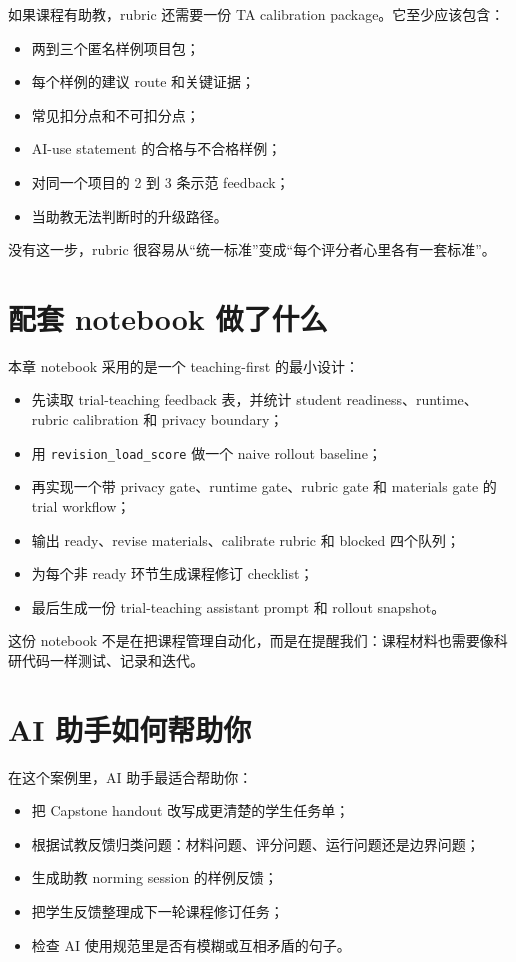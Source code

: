 如果课程有助教，rubric 还需要一份 TA calibration package。它至少应该包含：

\begin{itemize}
    \item 两到三个匿名样例项目包；
    \item 每个样例的建议 route 和关键证据；
    \item 常见扣分点和不可扣分点；
    \item AI-use statement 的合格与不合格样例；
    \item 对同一个项目的 2 到 3 条示范 feedback；
    \item 当助教无法判断时的升级路径。
\end{itemize}

没有这一步，rubric 很容易从“统一标准”变成“每个评分者心里各有一套标准”。

\section{配套 notebook 做了什么}

本章 notebook 采用的是一个 teaching-first 的最小设计：

\begin{itemize}
    \item 先读取 trial-teaching feedback 表，并统计 student readiness、runtime、rubric calibration 和 privacy boundary；
    \item 用 \texttt{revision\_load\_score} 做一个 naive rollout baseline；
    \item 再实现一个带 privacy gate、runtime gate、rubric gate 和 materials gate 的 trial workflow；
    \item 输出 ready、revise materials、calibrate rubric 和 blocked 四个队列；
    \item 为每个非 ready 环节生成课程修订 checklist；
    \item 最后生成一份 trial-teaching assistant prompt 和 rollout snapshot。
\end{itemize}

这份 notebook 不是在把课程管理自动化，而是在提醒我们：课程材料也需要像科研代码一样测试、记录和迭代。

\section{AI 助手如何帮助你}

在这个案例里，AI 助手最适合帮助你：

\begin{itemize}
    \item 把 Capstone handout 改写成更清楚的学生任务单；
    \item 根据试教反馈归类问题：材料问题、评分问题、运行问题还是边界问题；
    \item 生成助教 norming session 的样例反馈；
    \item 把学生反馈整理成下一轮课程修订任务；
    \item 检查 AI 使用规范里是否有模糊或互相矛盾的句子。
\end{itemize}

